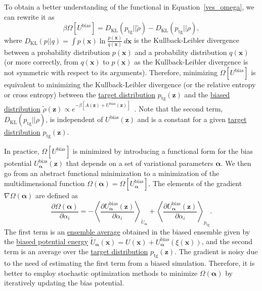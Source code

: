 \documentclass[9pt,review]{livecoms}
\newcommand{\vx}{\mathbf{x}}
\newcommand{\vz}{\mathbf{z}}
\begin{document}
To obtain a better understanding of the functional in Equation~\ref{ves_omega}, we can rewrite it as~\cite{Valsson2020Handbook_VES,Invernizzi-PNAS-2017}
\begin{equation}
\beta \Omega [U^{\mathrm{bias}}] = D_{\mathrm{KL}}(p_{\mathrm{tg}}||\tilde{\rho})-D_{\mathrm{KL}}(p_{\mathrm{tg}}||\rho),
\end{equation}
where $D_{\mathrm{KL}}(p||q)=\int p(\vx) \ln\frac{p(\vx)}{q(\vx)} \, d\vx$ is the Kullback-Leibler divergence between a probability distribution $p(\vx)$ and a probability distribution $q(\vx)$ (or more correctly, from  $q(\vx)$ to  $p(\vx)$ as the Kullback-Leibler divergence is not symmetric with respect to its arguments). Therefore, minimizing $\Omega [U^{\mathrm{bias}}]$ is equivalent to minimizing the Kullback-Leibler divergence (or the relative entropy or cross entropy) between the \hyperlink{ref:targetdist}{target distribution} $p_{\mathrm{tg}}(\vz)$ and the \hyperlink{ref:BiasedCVDist} {biased distribution} $\tilde{\rho}(\vz) \propto e^{-\beta \left[A(\vz) + U^\mathrm{bias}(\vz)\right]}$~\cite{Rubinstein-MetCompAppProb-1999,Shell-JCP-2008,Bilionis-JCompPhys-2012,Zhang_SIAM-JSC-2014}. Note that the second term, $D_{\mathrm{KL}}(p_{\mathrm{tg}}||\rho)$, is independent of $U^{\mathrm{bias}}(\vz)$ and is a constant for a given \hyperlink{ref:targetdist}{target distribution} $p_{\mathrm{tg}}(\vz)$. 


In practice, $\Omega [U^{\mathrm{bias}}]$ is minimized by introducing a functional form for the bias potential $U_{\boldsymbol{\alpha}}^\mathrm{bias}(\vz)$ that depends on a set of variational parameters $\boldsymbol{\alpha}$. We then go from an abstract functional minimization to a minimization of the multidimensional function $\Omega(\boldsymbol{\alpha}) = \Omega [U_{\boldsymbol{\alpha}}^{\mathrm{bias}}]$. The elements of the gradient $\nabla \Omega(\boldsymbol{\alpha})$ are defined as
\begin{equation}
\frac
{\partial \Omega({\boldsymbol{\alpha}})}
{\partial \alpha_{i}}
 = -
\left<
\frac
{\partial U_{\boldsymbol{\alpha}}^{\mathrm{bias}}(\vz)}
{\partial \alpha_{i}}
\right>_{\tilde{U}_{\boldsymbol{\alpha}}}
+
\left<
\frac
{\partial U_{\boldsymbol{\alpha}}^{\mathrm{bias}}(\vz)}
{\partial \alpha_{i}}
\right>_{p_{\mathrm{tg}}}.
\end{equation}
The first term is an \hyperlink{ref:ensemble_average} {ensemble average} obtained in the biased ensemble given by the
\hyperlink{ref:biasingE}{biased potential energy} $\tilde{U}_{\boldsymbol{\alpha}}(\vx) = U(\vx) + U_{\boldsymbol{\alpha}}^{\mathrm{bias}}(\xi(\vx))$, and the second term is an average over the \hyperlink{ref:targetdist}{target distribution} $p_{\mathrm{tg}}(\vz)$.  The gradient is noisy due to the need of estimating the first term from a biased simulation. Therefore, it is better to employ stochastic optimization methods to minimize $\Omega({\boldsymbol{\alpha}})$ by iteratively updating the bias potential.
\end{document}
